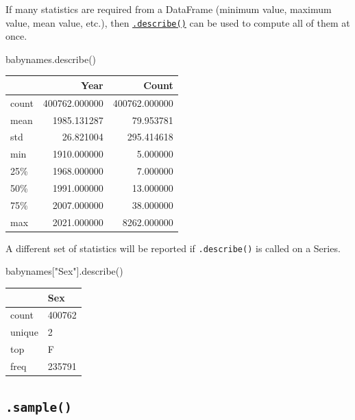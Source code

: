 \documentclass[
  letterpaper,
  DIV=11,
  numbers=noendperiod]{scrreprt}
\newenvironment{Shaded}{\begin{snugshade}}{\end{snugshade}}
\newcommand{\NormalTok}[1]{\textcolor[rgb]{0.00,0.23,0.31}{#1}}
\newcommand{\StringTok}[1]{\textcolor[rgb]{0.13,0.47,0.30}{#1}}
\begin{document}
If many statistics are required from a DataFrame (minimum value, maximum
value, mean value, etc.), then
\href{https://pandas.pydata.org/docs/reference/api/pandas.DataFrame.describe.html}{\texttt{.describe()}}
can be used to compute all of them at once.

\begin{Shaded}
\begin{Highlighting}[]
\NormalTok{babynames.describe()}
\end{Highlighting}
\end{Shaded}

\begin{tabular}{lrr}
\toprule
{} &           Year &          Count \\
\midrule
count &  400762.000000 &  400762.000000 \\
mean  &    1985.131287 &      79.953781 \\
std   &      26.821004 &     295.414618 \\
min   &    1910.000000 &       5.000000 \\
25\%   &    1968.000000 &       7.000000 \\
50\%   &    1991.000000 &      13.000000 \\
75\%   &    2007.000000 &      38.000000 \\
max   &    2021.000000 &    8262.000000 \\
\bottomrule
\end{tabular}

A different set of statistics will be reported if \texttt{.describe()}
is called on a Series.

\begin{Shaded}
\begin{Highlighting}[]
\NormalTok{babynames[}\StringTok{"Sex"}\NormalTok{].describe()}
\end{Highlighting}
\end{Shaded}

\begin{tabular}{ll}
\toprule
{} &     Sex \\
\midrule
count  &  400762 \\
unique &       2 \\
top    &       F \\
freq   &  235791 \\
\bottomrule
\end{tabular}

\hypertarget{sample}{%
\subsection{\texorpdfstring{\texttt{.sample()}}{.sample()}}\label{sample}}
\end{document}
